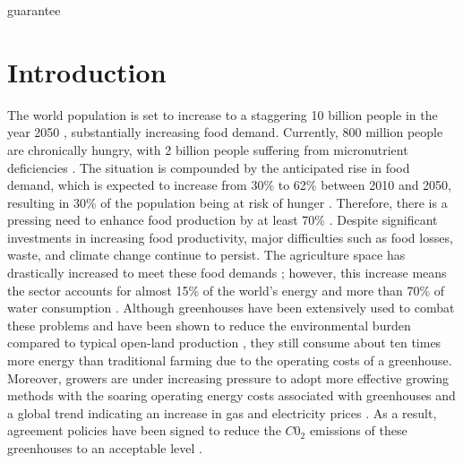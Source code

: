 guarantee\chapter{Introduction}
\label{chapter:introduction, written in the present tense}
The world population is set to increase to a staggering 10 billion people in the year 2050 \cite{blazhevskaGrowingSlowerPace2019}, substantially increasing food demand. Currently, 800 million people are chronically hungry, with 2 billion people suffering from micronutrient deficiencies \cite{faoFutureFoodAgriculture2017}. The situation is compounded by the anticipated rise in food demand, which is expected to increase from 30\% to 62\% between 2010 and 2050, resulting in 30\% of the population being at risk of hunger \cite{vandijkMetaanalysisProjectedGlobal2021}. Therefore, there is a pressing need to enhance food production by at least 70\% \cite{nishatGreenDealGreenhouse2020}. Despite significant investments in increasing food productivity, major difficulties such as food losses, waste, and climate change continue to persist\cite{faoFutureFoodAgriculture2017}. The agriculture space has drastically increased to meet these food demands \cite{winklerGlobalLandUse2021}; however, this increase means the sector accounts for almost 15\% of the world’s energy and more than 70\% of water consumption \cite{nishatGreenDealGreenhouse2020}. Although greenhouses have been extensively used to combat these problems and have been shown to reduce the environmental burden compared to typical open-land production \cite{munozComparingEnvironmentalImpacts2008}, they still consume about ten times more energy than traditional farming \cite{nishatGreenDealGreenhouse2020} due to the operating costs of a greenhouse. Moreover, growers are under increasing pressure to adopt more effective growing methods with the soaring operating energy costs associated with greenhouses and a global trend indicating an increase in gas and electricity prices \cite{alvarezWhatSoaringEnergy2021}. As a result, agreement policies have been signed to reduce the $C0_2$ emissions of these greenhouses to an acceptable level \cite{breukersPowerDutchGreenhouse}. \\

